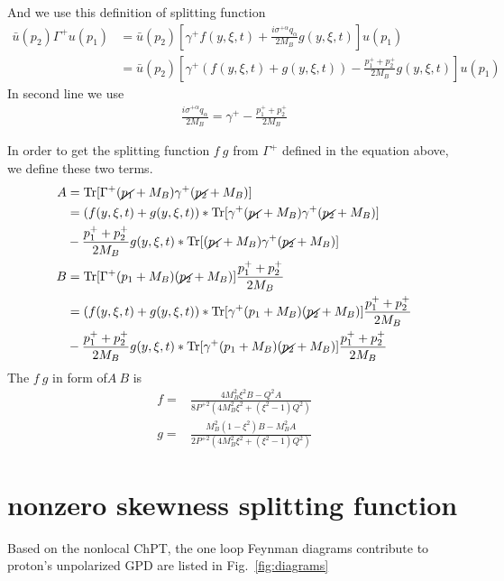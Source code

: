 \documentclass[preprintnumbers,prd,superscriptaddress,preprint]{revtex4-1}
\begin{document}
	And we use this definition of splitting function 
	\begin{align}
		\bar{u}(p_{2})\Gamma^{+}u(p_{1}) & =\bar{u}(p_{2})[\gamma^{+}f(y,\xi,t)+\frac{i\sigma^{+\alpha}q_{\alpha}}{2M_{B}}g(y,\xi,t)]u(p_{1})\\
		& =\bar{u}(p_{2})[\gamma^{+}(f(y,\xi,t)+g(y,\xi,t))-\frac{p_{1}^{+}+p_{2}^{+}}{2M_{B}}g(y,\xi,t)]u(p_{1})
	\end{align}
	In second line we use 
	\begin{align}
		\frac{i\sigma^{+\alpha}q_{\alpha}}{2M_{B}}=\gamma^{+}-\frac{p_{1}^{+}+p_{2}^{+}}{2M_{B}}
	\end{align}
	
	In order to get the splitting function $f\ g$ from $\Gamma^{+}$ defined in the equation above, we define these two terms. 
	\begin{align}
		A & =\textrm{Tr}[\Gamma^{+}(\cancel{p_{1}}+M_{B})\gamma^{+}(\cancel{p_{2}}+M_{B})]\\
		& =(f(y,\xi,t)+g(y,\xi,t))*\textrm{Tr}[\gamma^{+}(\cancel{p_{1}}+M_{B})\gamma^{+}(\cancel{p_{2}}+M_{B})]\\
		& -\frac{p_{1}^{+}+p_{2}^{+}}{2M_{B}}g(y,\xi,t)*\textrm{Tr}[(\cancel{p_{1}}+M_{B})\gamma^{+}(\cancel{p_{2}}+M_{B})]\\
		B & =\textrm{Tr}[\Gamma^{+}(p_{1}+M_{B})(\cancel{p_{2}}+M_{B})]\frac{p_{1}^{+}+p_{2}^{+}}{2M_{B}}\\
		& =(f(y,\xi,t)+g(y,\xi,t))*\textrm{Tr}[\gamma^{+}(p_{1}+M_{B})(\cancel{p_{2}}+M_{B})]\frac{p_{1}^{+}+p_{2}^{+}}{2M_{B}}\\
		& -\frac{p_{1}^{+}+p_{2}^{+}}{2M_{B}}g(y,\xi,t)*\textrm{Tr}[\gamma^{+}(p_{1}+M_{B})(\cancel{p_{2}}+M_{B})]\frac{p_{1}^{+}+p_{2}^{+}}{2M_{B}}
	\end{align}
	The $f\ g$ in form of$A\ B$ is 
	\begin{align}
		f= & \frac{4M_{B}^{2}\xi^{2}B-Q^{2}A}{8P^{+2}(4M_{B}^{2}\xi^{2}+(\xi^{2}-1)Q^{2})}\\
		g= & \frac{M_{B}^{2}(1-\xi^{2})B-M_{B}^{2}A}{2P^{+2}(4M_{B}^{2}\xi^{2}+(\xi^{2}-1)Q^{2})}
	\end{align}
	
	\section{nonzero skewness splitting function }
	Based on the nonlocal ChPT, the one loop Feynman diagrams contribute to proton's unpolarized GPD are listed in Fig.~\ref{fig:diagrams} 
	
\end{document}
